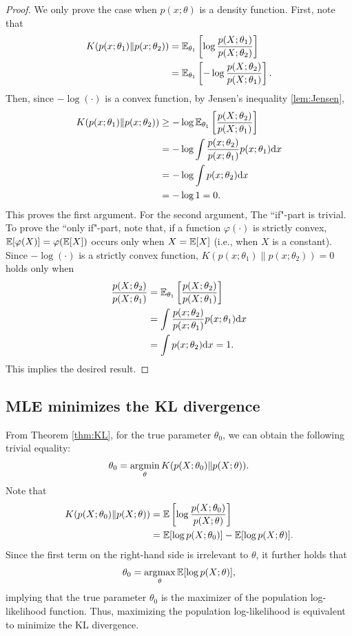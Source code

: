 \documentclass[11pt, A4paper, openany, uplatex]{book}
\begin{document}
\begin{proof}
	We only prove the case when $p(x; \theta)$ is a density function.
	First, note that
	\begin{align*}
		K(p(x; \theta_1) \| p(x; \theta_2))  
		& = \mathbb{E}_{\theta_1}\left[\log \frac{p(X; \theta_1)}{p(X; \theta_2)} \right] \\
		& = \mathbb{E}_{\theta_1}\left[- \log \frac{p(X; \theta_2)}{p(X; \theta_1)} \right].
	\end{align*}
	Then, since $-\log(\cdot)$ is a convex function, by Jensen's inequality \ref{lem:Jensen},
	\begin{align*}
	K(p(x; \theta_1) \| p(x; \theta_2))  
	& \geq -\log \mathbb{E}_{\theta_1}\left[ \frac{p(X; \theta_2)}{p(X; \theta_1)} \right]\\
	& = - \log \int \frac{p(x; \theta_2)}{p(x; \theta_1)}  p(x; \theta_1) \mathrm{d}x\\
	& = - \log \int p(x; \theta_2) \mathrm{d}x \\
	& = - \log 1 = 0.
	\end{align*}
	This proves the first argument.
	For the second argument, The ``if"-part is trivial.
	To prove the ``only if"-part, note that, if a function $\varphi(\cdot)$ is strictly convex, $\mathbb{E}[\varphi(X)] = \varphi(\mathbb{E}[X])$ occurs only when $X = \mathbb{E}[X]$ (i.e., when $X$ is a constant).
	 Since $- \log(\cdot)$ is a strictly convex function, $K(p(x; \theta_1) \| p(x; \theta_2)) = 0$ holds only when
	 \begin{align*}
	 	\frac{p(X; \theta_2)}{p(X; \theta_1)} 
	 	& =  \mathbb{E}_{\theta_1}\left[ \frac{p(X; \theta_2)}{p(X; \theta_1)} \right]\\
	 	& = \int \frac{p(x; \theta_2)}{p(x; \theta_1)}  p(x; \theta_1) \mathrm{d}x\\
	 	& = \int p(x; \theta_2) \mathrm{d}x = 1.
	 \end{align*}
	 This implies the desired result.
\end{proof}

\subsection{MLE minimizes the KL divergence}\label{subsec:MLEconsistency}

From Theorem \ref{thm:KL}, for the true parameter $\theta_0$, we can obtain the following trivial equality:
\begin{align*}
	\theta_0 = \operatorname*{\arg\!\min}_\theta K( p(X; \theta_0) \| p(X; \theta) ).
\end{align*}
 Note that
\begin{align*}
	K( p(X; \theta_0) \| p(X; \theta) )
	&= \mathbb{E}\left[\log \frac{p(X; \theta_0)}{p(X; \theta)} \right]\\
	&= \mathbb{E}[\log p(X; \theta_0)] - \mathbb{E}[\log p(X; \theta) ].
\end{align*}
Since the first term on the right-hand side is irrelevant to $\theta$, it further holds that
\begin{align}\label{eq:pop-mle}
	\theta_0 = \operatorname*{\arg\!\max}_\theta \mathbb{E}[\log p(X; \theta) ],
\end{align}
implying that the true parameter $\theta_0$ is the maximizer of the population log-likelihood function.
Thus, maximizing the population log-likelihood is equivalent to minimize the KL divergence.
\end{document}
